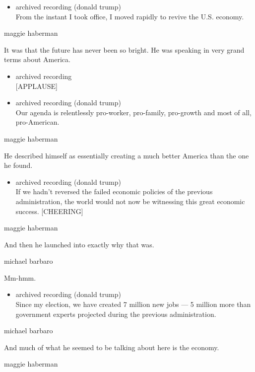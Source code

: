 \begin{itemize}
\tightlist
\item
  archived recording (donald trump)\\
  From the instant I took office, I moved rapidly to revive the U.S.
  economy.
\end{itemize}

maggie haberman

It was that the future has never been so bright. He was speaking in very
grand terms about America.

\begin{itemize}
\item
  archived recording\\
  {[}APPLAUSE{]}
\item
  archived recording (donald trump)\\
  Our agenda is relentlessly pro-worker, pro-family, pro-growth and most
  of all, pro-American.
\end{itemize}

maggie haberman

He described himself as essentially creating a much better America than
the one he found.

\begin{itemize}
\tightlist
\item
  archived recording (donald trump)\\
  If we hadn't reversed the failed economic policies of the previous
  administration, the world would not now be witnessing this great
  economic success. {[}CHEERING{]}
\end{itemize}

maggie haberman

And then he launched into exactly why that was.

michael barbaro

Mm-hmm.

\begin{itemize}
\tightlist
\item
  archived recording (donald trump)\\
  Since my election, we have created 7 million new jobs --- 5 million
  more than government experts projected during the previous
  administration.
\end{itemize}

michael barbaro

And much of what he seemed to be talking about here is the economy.

maggie haberman


